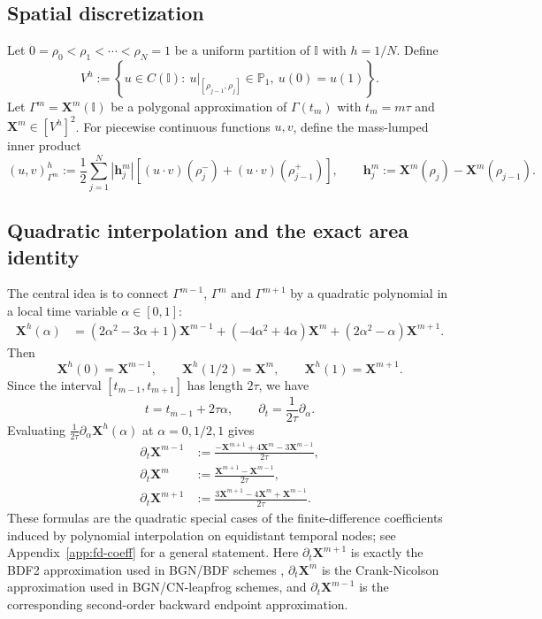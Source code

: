 \documentclass[smallextended]{svjour3}
\numberwithin{equation}{section}
\begin{document}
	\subsection{Spatial discretization}
	
	Let $0=\rho_0<\rho_1<\cdots<\rho_N=1$ be a uniform partition of $\mathbb{I}$ with $h=1/N$. Define
	\[
	V^h:=\left\{u\in C(\mathbb{I}):\ u|_{[\rho_{j-1},\rho_j]}\in\mathbb{P}_1,\ 
	u(0)=u(1)\right\}.
	\]
	Let $\Gamma^m=\mathbf{X}^m(\mathbb{I})$ be a polygonal approximation of $\Gamma(t_m)$ with $t_m=m\tau$ and $\mathbf{X}^m\in[V^h]^2$. For piecewise continuous functions $u,v$, define the mass-lumped inner product
	\begin{equation}
		(u,v)^h_{\Gamma^m}
		:=
		\frac12\sum_{j=1}^N |\mathbf{h}_j^m|
		\left[(u\cdot v)(\rho_j^-)+(u\cdot v)(\rho_{j-1}^+)\right],
		\qquad
		\mathbf{h}_j^m:=\mathbf{X}^m(\rho_j)-\mathbf{X}^m(\rho_{j-1}).
	\end{equation}
	
	\subsection{Quadratic interpolation and the exact area identity}
	
	The central idea is to connect $\Gamma^{m-1}$, $\Gamma^m$ and $\Gamma^{m+1}$ by a quadratic polynomial in a local time variable $\alpha\in[0,1]$:
	\begin{equation}
		\begin{aligned}
			\mathbf{X}^h(\alpha)
			&=
			(2\alpha^2-3\alpha+1)\mathbf{X}^{m-1}
			+(-4\alpha^2+4\alpha)\mathbf{X}^{m}
			+(2\alpha^2-\alpha)\mathbf{X}^{m+1}.
		\end{aligned}
		\label{eq:quad-X-2d}
	\end{equation}
	Then
	\[
	\mathbf{X}^h(0)=\mathbf{X}^{m-1},\qquad
	\mathbf{X}^h(1/2)=\mathbf{X}^{m},\qquad
	\mathbf{X}^h(1)=\mathbf{X}^{m+1}.
	\]
	Since the interval $[t_{m-1},t_{m+1}]$ has length $2\tau$, we have
	\[
	t=t_{m-1}+2\tau\alpha,
	\qquad
	\partial_t=\frac{1}{2\tau}\partial_\alpha.
	\]
	Evaluating $\frac{1}{2\tau}\partial_\alpha\mathbf{X}^h(\alpha)$ at $\alpha=0,1/2,1$ gives
	\begin{align}
		\partial_t \mathbf{X}^{m-1}
		&:=
		\frac{-\mathbf{X}^{m+1}+4\mathbf{X}^{m}-3\mathbf{X}^{m-1}}{2\tau},
		\label{eq:D-mminus}
		\\
		\partial_t \mathbf{X}^{m}
		&:=
		\frac{\mathbf{X}^{m+1}-\mathbf{X}^{m-1}}{2\tau},
		\label{eq:D-m}
		\\
		\partial_t \mathbf{X}^{m+1}
		&:=
		\frac{3\mathbf{X}^{m+1}-4\mathbf{X}^{m}+\mathbf{X}^{m-1}}{2\tau}.
		\label{eq:D-mplus}
	\end{align}
	These formulas are the quadratic special cases of the finite-difference coefficients induced by polynomial interpolation on equidistant temporal nodes; see Appendix~\ref{app:fd-coeff} for a general statement. Here $\partial_t \mathbf{X}^{m+1}$ is exactly the BDF2 approximation used in BGN/BDF schemes \cite{jiang2024stable}, $\partial_t \mathbf{X}^{m}$ is the Crank-Nicolson approximation used in BGN/CN-leapfrog schemes, and $\partial_t \mathbf{X}^{m-1}$ is the corresponding second-order backward endpoint approximation.
	
\end{document}
